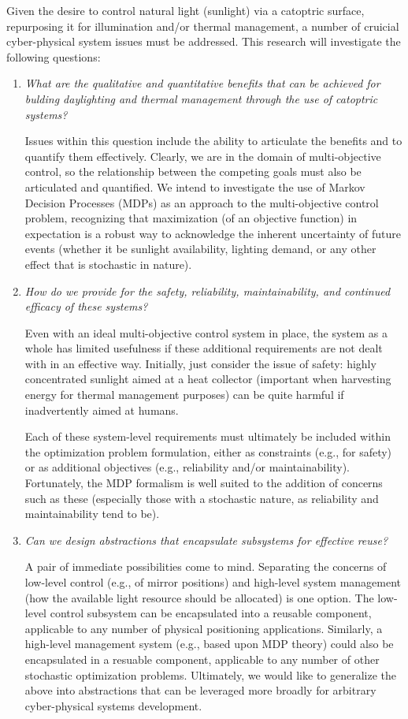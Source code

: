 Given the desire to control natural light (sunlight) via a catoptric surface,
repurposing it for illumination and/or thermal management, a number of
cruicial cyber-physical system issues must be addressed.
This research will investigate the following questions:
\begin{enumerate}

\item \emph{What are the qualitative and quantitative benefits
that can be achieved for bulding daylighting and thermal management
through the use of catoptric systems?}

Issues within this question include the ability to articulate the benefits
and to quantify them effectively.  Clearly, we are in the domain
of multi-objective control, so the relationship between the competing
goals must also be articulated and quantified. We intend to investigate
the use of Markov Decision Processes (MDPs) as an approach to
the multi-objective control problem, recognizing that maximization
(of an objective function) in expectation is a robust way to acknowledge
the inherent uncertainty of future events (whether it be sunlight availability,
lighting demand, or any other effect that is stochastic in nature).

\item \emph{How do we provide for the safety, reliability, maintainability, and
continued efficacy of these systems?}

Even with an ideal multi-objective control system in place, the system as
a whole has limited usefulness if these additional requirements are not
dealt with in an effective way.  Initially, just consider the issue of
safety: highly concentrated sunlight aimed at a heat collector (important
when harvesting energy for thermal management purposes) can be quite harmful
if inadvertently aimed at humans. 

Each of these system-level requirements must ultimately be included within
the optimization problem formulation, either as constraints (e.g., for
safety) or as additional objectives (e.g., reliability and/or maintainability).
Fortunately, the MDP formalism is well suited to the addition of concerns
such as these (especially those with a stochastic nature, as reliability
and maintainability tend to be).

\item \emph{Can we design abstractions that encapsulate subsystems for
effective reuse?}

A pair of immediate possibilities come to mind. Separating the concerns
of low-level control (e.g., of mirror positions) and high-level system
management (how the available light resource should be allocated) is one
option.  The low-level control subsystem can be encapsulated into a reusable
component, applicable to any number of physical positioning applications.
Similarly, a high-level management system (e.g., based upon MDP theory)
could also be encapsulated in a resuable component, applicable to any
number of other stochastic optimization problems.
Ultimately, we would like to generalize the above into abstractions that can be
leveraged more broadly for arbitrary cyber-physical systems development.

\end{enumerate}

